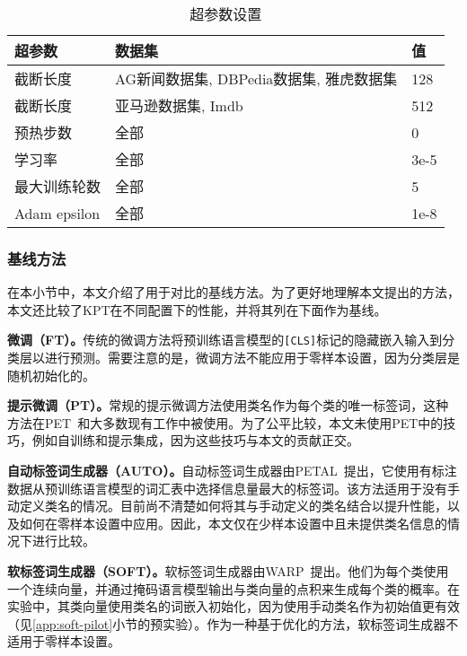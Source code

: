 \begin{table}[!htbp]
    \centering
    \begin{tabular}{p{}p{}p{}}
\toprule
      超参数  & 数据集 & 值 \\
\midrule
   截断长度  & AG新闻数据集, DBPedia数据集, 雅虎数据集    &  128 \\
截断长度  & 亚马逊数据集, Imdb    &  512 \\
   预热步数 & 全部 & 0 \\
   学习率 & 全部 & 3e-5 \\
   最大训练轮数 & 全部 & 5\\
   Adam epsilon & 全部 & 1e-8 \\
\bottomrule
    \end{tabular}
    \caption{超参数设置}
    \label{tab:app_exp_settings}
\end{table}




\subsubsection{基线方法}
在本小节中，本文介绍了用于对比的基线方法。为了更好地理解本文提出的方法，本文还比较了KPT在不同配置下的性能，并将其列在下面作为基线。

\textbf{微调（FT）。}\quad 传统的微调方法将预训练语言模型的\texttt{[CLS]}标记的隐藏嵌入输入到分类层以进行预测。需要注意的是，微调方法不能应用于零样本设置，因为分类层是随机初始化的。

\textbf{提示微调（PT）。}\quad 常规的提示微调方法使用类名作为每个类的唯一标签词，这种方法在PET~\cite{schick2020exploiting}和大多数现有工作中被使用。为了公平比较，本文未使用PET中的技巧，例如自训练和提示集成，因为这些技巧与本文的贡献正交。

\textbf{自动标签词生成器（AUTO）。}\quad 自动标签词生成器由PETAL~\cite{schick2020automatically}提出，它使用有标注数据从预训练语言模型的词汇表中选择信息量最大的标签词。该方法适用于没有手动定义类名的情况。目前尚不清楚如何将其与手动定义的类名结合以提升性能，以及如何在零样本设置中应用。因此，本文仅在少样本设置中且未提供类名信息的情况下进行比较。

\textbf{软标签词生成器（SOFT）。}\quad 软标签词生成器由WARP~\cite{hambardzumyan-etal-2021-warp}提出。他们为每个类使用一个连续向量，并通过掩码语言模型输出与类向量的点积来生成每个类的概率。在实验中，其类向量使用类名的词嵌入初始化，因为使用手动类名作为初始值更有效（见\ref{app:soft-pilot}小节的预实验）。作为一种基于优化的方法，软标签词生成器不适用于零样本设置。

